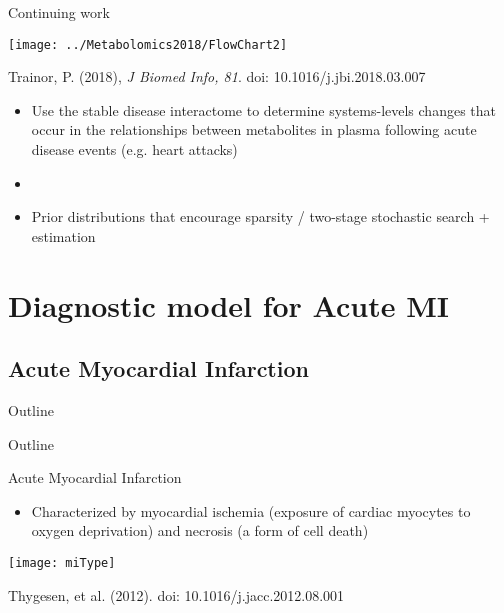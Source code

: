 \documentclass[xcolor=dvipsnames]{beamer}
\begin{document}
\begin{frame}{Continuing work}
	\vspace{-15pt}
	\begin{center}
		\texttt{[image: ../Metabolomics2018/FlowChart2]}
		
		Trainor, P. (2018), \emph{J Biomed Info, 81}. doi: 10.1016/j.jbi.2018.03.007 \pause
	\end{center}
	\begin{itemize}
		\item Use the stable disease interactome to determine systems-levels changes that occur in the relationships between metabolites in plasma following acute disease events (e.g. heart attacks) \pause
		\item[]
		\item Prior distributions that encourage sparsity / two-stage stochastic search + estimation 
	\end{itemize}
\end{frame}

\section{Diagnostic model for Acute MI}
\subsection{Acute Myocardial Infarction}
\begin{frame}{Outline}
\vspace{-10.5pt}
\tableofcontents[currentsection,subsectionstyle=hide]
\end{frame}

\begin{frame}{Outline}
\vspace{-10.5pt}
\tableofcontents[currentsection,subsectionstyle=show/shaded/hide]
\end{frame}

\begin{frame}{Acute Myocardial Infarction}
\vspace{-5pt}
\begin{itemize}
\item Characterized by myocardial ischemia (exposure of cardiac myocytes to oxygen deprivation) and necrosis (a form of cell death)
\end{itemize}
\begin{center}
\texttt{[image: miType]}

Thygesen, et al. (2012). doi: 10.1016/j.jacc.2012.08.001
\end{center}
\end{frame}
\end{document}
